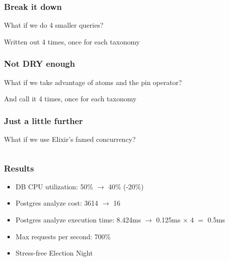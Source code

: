 \documentclass{beamer}
\begin{document}
\begin{frame}
\frametitle{Break it down}
\pause
	What if we do 4 smaller queries?
	\pause
	
	\pause
	Written out 4 times,  once for each taxonomy
\end{frame}


\begin{frame}
\frametitle{Not DRY enough}
\pause
	What if we take advantage of atoms and the pin operator?
	\pause
	
	\pause
	And call it 4 times,  once for each taxonomy
\end{frame}


\begin{frame}
\frametitle{Just a little further}
\pause
	What if we use Elixir's famed concurrency?
	\pause
	\begin{columns}
		\begin{column}{0.3\textwidth}
		    
		\end{column}
		\begin{column}{0.6\textwidth}
		    
		\end{column}
	\end{columns}
\end{frame}


\begin{frame}
\frametitle{Results}
	\begin{itemize}
		\item DB CPU utilization: 50\% $\rightarrow$ 40\% (-20\%)
\pause
		\item Postgres analyze cost: 3614 $\rightarrow$ 16
		\item Postgres analyze execution time: 8.424ms $\rightarrow$ 0.125ms $\times$ 4 $=$ 0.5ms
\pause
		\item Max requests per second: 700\%
\pause
		\item Stress-free Election Night
	\end{itemize}
\end{frame}
\end{document}

